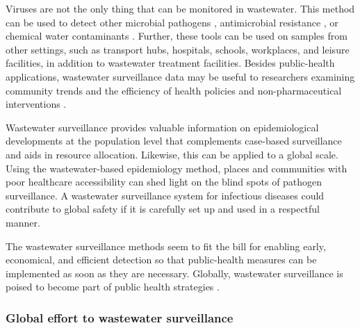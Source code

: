         Viruses are not the only thing that can be monitored in wastewater. This method can be used to detect other microbial pathogens \cite{ko2022}, antimicrobial resistance \cite{hendriksen2019}, or chemical water contaminants \cite{jung2020}. Further, these tools can be used on samples from other settings, such as transport hubs, hospitals, schools, workplaces, and leisure facilities, in addition to wastewater treatment facilities. Besides public-health applications, wastewater surveillance data may be useful to researchers examining community trends and the efficiency of health policies and non-pharmaceutical interventions \cite{wastewater2022}. 
        
        Wastewater surveillance provides valuable information on epidemiological developments at the population level that complements case-based surveillance and aids in resource allocation. Likewise, this can be applied to a global scale. Using the wastewater-based epidemiology method, places and communities with poor healthcare accessibility can shed light on the blind spots of pathogen surveillance. A wastewater surveillance system for infectious diseases could contribute to global safety if it is carefully set up and used in a respectful manner.

        The wastewater surveillance methods seem to fit the bill for enabling early, economical, and efficient detection so that public-health measures can be implemented as soon as they are necessary. Globally, wastewater surveillance is poised to become part of public health strategies \cite{hendriksen2019}. 

        \subsubsection{Global effort to wastewater surveillance} 
        
